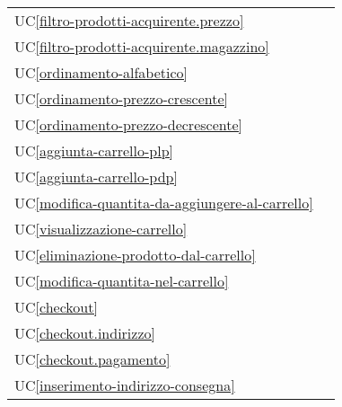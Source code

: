 \begin{longtable}{C{6cm} C{6cm}}
	UC\ref{filtro-prodotti-acquirente.prezzo} &  \\

    UC\ref{filtro-prodotti-acquirente.magazzino} &  \\

    UC\ref{ordinamento-alfabetico} &  \\

	UC\ref{ordinamento-prezzo-crescente} &  \\

    UC\ref{ordinamento-prezzo-decrescente} &  \\

	UC\ref{aggiunta-carrello-plp} &  \\

    UC\ref{aggiunta-carrello-pdp} &  \\

	UC\ref{modifica-quantita-da-aggiungere-al-carrello} &  \\

    UC\ref{visualizzazione-carrello} &  \newline {} \\

    UC\ref{eliminazione-prodotto-dal-carrello} &  \\

	UC\ref{modifica-quantita-nel-carrello} &  \\

    UC\ref{checkout} &  \\

	UC\ref{checkout.indirizzo} &  \\

    UC\ref{checkout.pagamento} &  \\

    UC\ref{inserimento-indirizzo-consegna} &  \\


\end{longtable}
